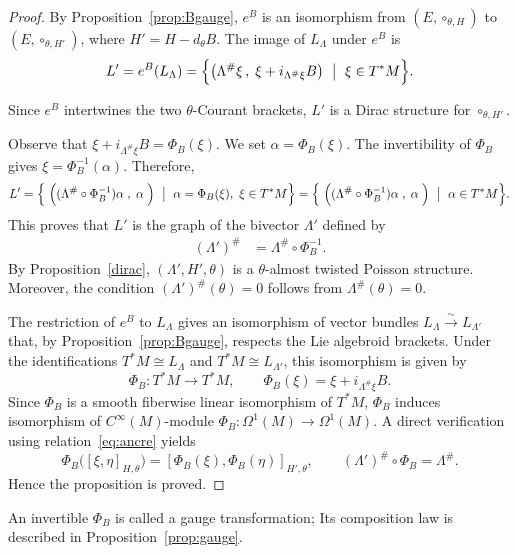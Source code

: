 \documentclass[11pt,a4paper]{article}
\theoremstyle{plain}
\theoremstyle{definition}
\theoremstyle{remark}
\begin{document}
\begin{proof}
By Proposition~\ref{prop:Bgauge}, $e^{B}$ is an isomorphism from $(E,\circ_{\theta,H})$
to $(E,\circ_{\theta,H'})$, where $H' = H - d_{\theta}B$. The image of $L_{\Lambda}$ under
$e^{B}$ is
$$
L' = e^{B}(L_{\Lambda})
= \Bigl\{\big(\Lambda^\#\xi\,,\;\xi+i_{\Lambda^\#\xi}B\big)\ \bigm|\ \xi\in T^*M\Bigr\}.
$$

Since $e^{B}$ intertwines the two $\theta$-Courant brackets, $L'$ is a Dirac structure for
$\circ_{\theta,H'}$.

Observe that $\xi+i_{\Lambda^\#\xi}B=\Phi_{B}(\xi)$. We set
$\alpha=\Phi_{B}(\xi)$.  The invertibility of $\Phi_{B}$ gives
$\xi=\Phi_{B}^{-1}(\alpha)$. Therefore,
\begin{equation*}
	L'=\Bigl\{\ \Big((\Lambda^\#\circ\Phi_{B}^{-1})\alpha\; ,\; \alpha\;\Big) \ \bigm|\ \alpha=\Phi_B(\xi),\ \xi\in T^*M \Bigr\}
	=\Bigl\{\ \Big((\Lambda^\#\circ\Phi_{B}^{-1})\alpha\; ,\; \alpha\;\Big)\ \bigm|\ \alpha\in T^*M\Bigr\}.
\end{equation*}
This proves that $L'$ is the graph of the bivector $\Lambda'$ defined by
\begin{align}\label{eq:ancre}
	(\Lambda')^\# &= \Lambda^\#\circ\Phi_{B}^{-1}.
\end{align}
By Proposition~\ref{dirac}, $(\Lambda',H',\theta)$ is a $\theta$-almost twisted
Poisson structure. Moreover, the condition $(\Lambda')^\#(\theta)=0$ follows from
$\Lambda^\#(\theta)=0$.

The restriction of $e^{B}$ to $L_{\Lambda}$ gives an isomorphism of vector bundles
$L_{\Lambda}\xrightarrow{\sim}L_{\Lambda'}$ that, by Proposition~\ref{prop:Bgauge},
respects the Lie algebroid brackets. Under the identifications
$T^*M\cong L_{\Lambda}$ and $T^*M\cong L_{\Lambda'}$, this isomorphism is
given by
$$
\Phi_{B}\colon T^*M\longrightarrow T^*M,\qquad
\Phi_{B}(\xi)=\xi+i_{\Lambda^\#\xi}B.
$$
 Since $\Phi_B$ is a smooth fiberwise linear isomorphism of $T^*M$,  $\Phi_B$ induces isomorphism of $C^\infty(M)$-module $\Phi_{B}\colon \Omega^{1}(M)\longrightarrow \Omega^{1}(M)$.
A direct verification using relation~\eqref{eq:ancre} yields
\begin{equation}\label{eq:phiB}
	\Phi_{B}\bigl([\xi,\eta]_{H,\theta}\bigr)
	=[\Phi_{B}(\xi),\Phi_{B}(\eta)]_{H',\theta},
	\qquad
	(\Lambda')^\#\circ\Phi_{B}=\Lambda^\#.
\end{equation}
Hence the proposition is proved.
\end{proof}

   An invertible  $\Phi_{B}$ is called  a gauge transformation; Its composition law  is described in  Proposition~\ref{prop:gauge}.
\end{document}
